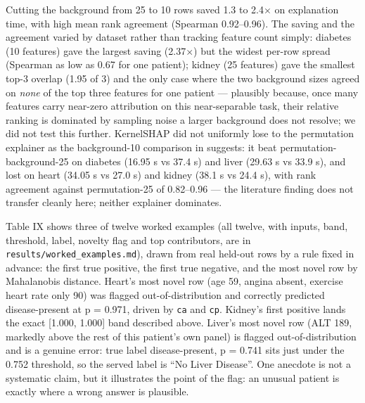 \documentclass[conference]{IEEEtran}
\begin{document}
Cutting the background from 25 to 10 rows saved 1.3 to 2.4$\times$ on explanation time, with high mean rank agreement (Spearman 0.92--0.96). The saving and the agreement varied by dataset rather than tracking feature count simply: diabetes (10 features) gave the largest saving (2.37$\times$) but the widest per-row spread (Spearman as low as 0.67 for one patient); kidney (25 features) gave the smallest top-3 overlap (1.95 of 3) and the only case where the two background sizes agreed on \emph{none} of the top three features for one patient --- plausibly because, once many features carry near-zero attribution on this near-separable task, their relative ranking is dominated by sampling noise a larger background does not resolve; we did not test this further. KernelSHAP did not uniformly lose to the permutation explainer as the background-10 comparison in \cite{realtime2026} suggests: it beat permutation-background-25 on diabetes (16.95 s vs 37.4 s) and liver (29.63 s vs 33.9 s), and lost on heart (34.05 s vs 27.0 s) and kidney (38.1 s vs 24.4 s), with rank agreement against permutation-25 of 0.82--0.96 --- the literature finding does not transfer cleanly here; neither explainer dominates.

Table IX shows three of twelve worked examples (all twelve, with inputs, band, threshold, label, novelty flag and top contributors, are in \texttt{results/worked\_examples.md}), drawn from real held-out rows by a rule fixed in advance: the first true positive, the first true negative, and the most novel row by Mahalanobis distance. Heart's most novel row (age 59, angina absent, exercise heart rate only 90) was flagged out-of-distribution and correctly predicted disease-present at p = 0.971, driven by \texttt{ca} and \texttt{cp}. Kidney's first positive lands the exact [1.000, 1.000] band described above. Liver's most novel row (ALT 189, markedly above the rest of this patient's own panel) is flagged out-of-distribution and is a genuine error: true label disease-present, p = 0.741 sits just under the 0.752 threshold, so the served label is ``No Liver Disease''. One anecdote is not a systematic claim, but it illustrates the point of the flag: an unusual patient is exactly where a wrong answer is plausible.

\begin{table}[!t]
\caption{Selected worked examples on real held-out test rows (full set in \texttt{results/worked\_examples.md}).}
\label{tab:worked}
\centering\footnotesize
{}
\end{table}
\end{document}
